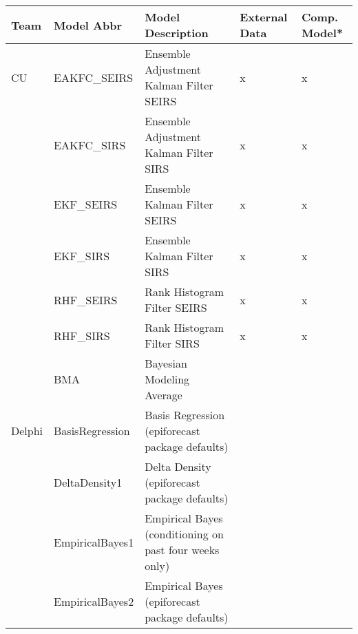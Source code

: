 \begin{table}
\setlength{\tabcolsep}{4pt} 
\begin{tabular}{p{1.69cm} l p{7.5cm}  p{1.70cm}  p{1.7cm}}
\textbf{Team}     & \textbf{Model Abbr} & \textbf{Model Description}                                                                                     & \textbf{External Data} & \textbf{Comp. Model*} \\ 
\hline
CU       & EAKFC\_SEIRS       & Ensemble Adjustment Kalman Filter SEIRS                                                        & x             & x                   \\ 

~        & EAKFC\_SIRS        & Ensemble Adjustment Kalman Filter SIRS                                                         & x             & x                   \\
~        & EKF\_SEIRS         & Ensemble Kalman Filter SEIRS                                                                   & x             & x                   \\
~        & EKF\_SIRS          & Ensemble Kalman Filter SIRS                                                                    & x             & x                   \\
~        & RHF\_SEIRS         & Rank Histogram Filter SEIRS                                                                    & x             & x                   \\
~        & RHF\_SIRS          & Rank Histogram Filter SIRS                                                                     & x             & x                   \\
~        & BMA                & Bayesian Modeling Average                                                                      & ~             & ~                   \\
\hline
Delphi   & BasisRegression    & Basis Regression (epiforecast package defaults)                                                & ~             & ~                   \\ 
~        & DeltaDensity1      & Delta Density (epiforecast package defaults)                                                   & ~             & ~                   \\ 
~        & EmpiricalBayes1    & Empirical Bayes (conditioning on past four weeks only)                                         & ~             & ~                   \\ 
~        & EmpiricalBayes2    & Empirical Bayes (epiforecast package defaults)                                                 & ~             & ~                   \\ 

\end{tabular}
\end{table}
